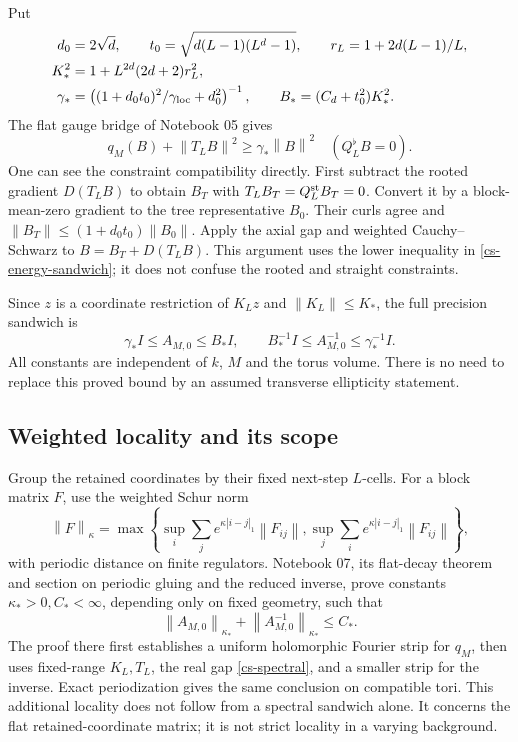 \documentclass[11pt]{article}
\theoremstyle{remark}
\newcommand{\norm}[1]{\left\|#1\right\|}
\begin{document}
Put
\begin{equation}\label{cs-constants}
 \begin{split}
 d_0&=2\sqrt d,\qquad
 t_0=\sqrt{d(L-1)(L^d-1)},\qquad
 r_L=1+2d(L-1)/L,\\
 K_*^2&=1+L^{2d}(2d+2)r_L^2,\\
 \gamma_*&=
 \left((1+d_0t_0)^2/\gamma_{\rm loc}+d_0^2\right)^{-1},
 \qquad B_*=(C_d+t_0^2)K_*^2.
 \end{split}
\end{equation}
The flat gauge bridge of Notebook 05 gives
\[
 q_M(B)+\norm{T_LB}^2\ge\gamma_*\norm B^2
 \quad (Q_L^\flat B=0).
\]
One can see the constraint compatibility directly. First subtract
the rooted gradient $D(T_LB)$ to obtain $B_T$ with
$T_LB_T=Q_L^{\rm st}B_T=0$. Convert it by a block-mean-zero
gradient to the tree representative $B_0$. Their curls agree and
$\norm{B_T}\le(1+d_0t_0)\norm{B_0}$. Apply the axial gap and
weighted Cauchy--Schwarz to
$B=B_T+D(T_LB)$. This argument uses the lower inequality in
\eqref{cs-energy-sandwich}; it does not confuse the rooted and
straight constraints.

Since $z$ is a coordinate restriction of $K_Lz$ and
$\norm{K_L}\le K_*$, the full precision sandwich is
\begin{equation}\label{cs-spectral}
 \gamma_*I\le A_{M,0}\le B_*I,
 \qquad
 B_*^{-1}I\le A_{M,0}^{-1}\le\gamma_*^{-1}I.
\end{equation}
All constants are independent of $k$, $M$ and the torus volume.
There is no need to replace this proved bound by an assumed
transverse ellipticity statement.

\subsection{Weighted locality and its scope}

Group the retained coordinates by their fixed next-step $L$-cells.
For a block matrix $F$, use the weighted Schur norm
\[
 \norm F_\kappa=
 \max\left\{
 \sup_i\sum_j e^{\kappa|i-j|_1}\norm{F_{ij}},
 \sup_j\sum_i e^{\kappa|i-j|_1}\norm{F_{ij}}
 \right\},
\]
with periodic distance on finite regulators. Notebook 07,
its flat-decay theorem and section on periodic gluing and the reduced inverse,
prove constants $\kappa_*>0,C_*<\infty$, depending only on fixed
geometry, such that
\begin{equation}\label{cs-weighted}
 \norm{A_{M,0}}_{\kappa_*}
 +\norm{A_{M,0}^{-1}}_{\kappa_*}\le C_*.
\end{equation}
The proof there first establishes a uniform holomorphic Fourier
strip for $q_M$, then uses fixed-range $K_L,T_L$, the real gap
\eqref{cs-spectral}, and a smaller strip for the inverse.
Exact periodization gives the same conclusion on compatible tori.
This additional locality does not follow from a spectral sandwich
alone. It concerns the flat retained-coordinate matrix; it is not
strict locality in a varying background.
\end{document}
